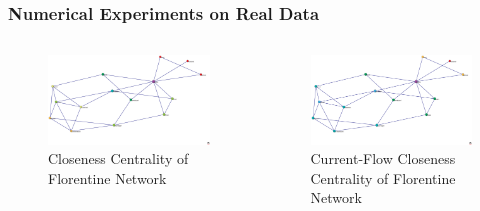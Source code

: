 \documentclass{beamer}
\begin{document}
\begin{frame}
\frametitle{Numerical Experiments on Real Data}
\begin{columns}[T]
\begin{column}{.5\textwidth}
\begin{figure}[h]
\begin{center}
\includegraphics[width=0.76\columnwidth]{Florentine_closeness2}
\end{center}
\caption{Closeness Centrality of Florentine Network}
\label{fig:Closeness Centrality - Florentine}
\end{figure}
\end{column}
\begin{column}{.5\textwidth}
\begin{figure}[h]
\begin{center}
\includegraphics[width=0.76\columnwidth]{florentine_current_flow_closeness2}
\end{center}
\caption{Current-Flow Closeness Centrality of Florentine Network}
\label{fig:Current-Flow Closeness Centrality - Florentine}
\end{figure}
\end{column}
\end{columns}
\end{frame}
\end{document}
